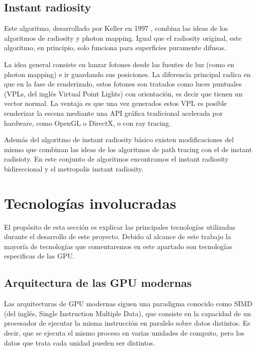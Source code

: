 \subsection{Instant radiosity}

Este algoritmo, desarrollado por Keller en 1997 \nocite{Keller1997}, combina las ideas de los algoritmos de radiosity y photon mapping. Igual que el radiosity original, este algoritmo, en principio, solo funciona para superficies puramente difusas.

\medskip
La idea general consiste en lanzar fotones desde las fuentes de luz (como en photon mapping) e ir guardando sus posiciones. La diferencia principal radica en que en la fase de renderizado, estos fotones son tratados como luces puntuales (VPLs, del inglés Virtual Point Lights) con orientación, es decir que tienen un vector normal. La ventaja es que una vez generados estos VPL es posible renderizar la escena mediante una API gráfica tradicional acelerada por hardware, como OpenGL o DirectX, o con ray tracing.

\medskip

Además del algoritmo de instant radiosity básico existen modificaciones del mismo que combinan las ideas de los algoritmos de path tracing con el de instant radisioty. En este conjunto de algoritmos encontramos el instant radiosity bidireccional y el metropolis instant radiosity.  


\clearpage

\section{Tecnologías involucradas}

El propósito de esta sección es explicar las principales tecnologías utilizadas durante el desarrollo de este proyecto. Debido al alcance de este trabajo la mayoría de tecnologías que comentaremos en este apartado son tecnologías especificas de las GPU.

\subsection{Arquitectura de las GPU modernas}

Las arquitecturas de GPU modernas siguen una paradigma conocido como SIMD (del inglés, Single Instruction Multiple Data), que consiste en la capacidad de un procesador de ejecutar la misma instrucción en paralelo sobre datos distintos. Es decir, que se ejecuta el mismo proceso en varias unidades de computo, pero los datos que trata cada unidad pueden ser distintos.

